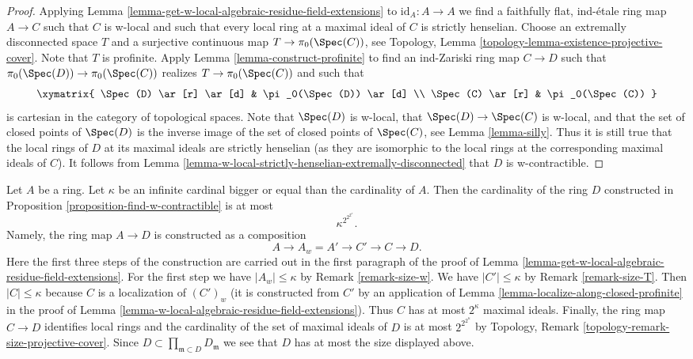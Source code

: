 \begin{proof}
Applying Lemma \ref{lemma-get-w-local-algebraic-residue-field-extensions}
to $\text{id}_A : A \to A$ we find a faithfully flat, ind-\'etale ring map
$A \to C$ such that $C$ is w-local and such that every local ring at a
maximal ideal of $C$ is strictly henselian.
Choose an extremally disconnected space $T$ and a surjective
continuous map $T \to \pi_0(\Spec(C))$, see
Topology, Lemma \ref{topology-lemma-existence-projective-cover}.
Note that $T$ is profinite. Apply Lemma \ref{lemma-construct-profinite}
to find an ind-Zariski ring map $C \to D$ such that
$\pi_0(\Spec(D)) \to \pi_0(\Spec(C))$ realizes $T \to \pi_0(\Spec(C))$
and such that
$$
\xymatrix{
\Spec(D) \ar[r] \ar[d] & \pi_0(\Spec(D)) \ar[d] \\
\Spec(C) \ar[r] & \pi_0(\Spec(C))
}
$$
is cartesian in the category of topological spaces. Note that $\Spec(D)$
is w-local, that $\Spec(D) \to \Spec(C)$ is w-local, and that the
set of closed points of $\Spec(D)$ is the inverse image of the
set of closed points of $\Spec(C)$, see Lemma \ref{lemma-silly}.
Thus it is still true that the local rings of $D$ at its maximal
ideals are strictly henselian (as they are isomorphic to the
local rings at the corresponding maximal ideals of $C$).
It follows from
Lemma \ref{lemma-w-local-strictly-henselian-extremally-disconnected}
that $D$ is w-contractible.
\end{proof}

\begin{remark}
\label{remark-size-w-contractible}
Let $A$ be a ring. Let $\kappa$ be an infinite cardinal bigger or
equal than the cardinality of $A$. Then the cardinality of the
ring $D$ constructed in Proposition \ref{proposition-find-w-contractible}
is at most
$$
\kappa^{2^{2^{2^\kappa}}}.
$$
Namely, the ring map $A \to D$ is
constructed as a composition
$$
A \to A_w = A' \to C' \to C \to D.
$$
Here the first three steps of the construction are carried out
in the first paragraph of the proof of
Lemma \ref{lemma-get-w-local-algebraic-residue-field-extensions}.
For the first step we have $|A_w| \leq \kappa$ by
Remark \ref{remark-size-w}.
We have $|C'| \leq \kappa$ by
Remark \ref{remark-size-T}.
Then $|C| \leq \kappa$ because $C$ is a localization of $(C')_w$
(it is constructed from $C'$ by an application of
Lemma \ref{lemma-localize-along-closed-profinite}
in the proof of Lemma \ref{lemma-w-local-algebraic-residue-field-extensions}).
Thus $C$ has at most $2^\kappa$ maximal ideals.
Finally, the ring map $C \to D$ identifies local rings and the
cardinality of the set of maximal ideals of $D$ is at most
$2^{2^{2^\kappa}}$ by
Topology, Remark \ref{topology-remark-size-projective-cover}.
Since $D \subset \prod_{\mathfrak m \subset D} D_\mathfrak m$ we see
that $D$ has at most the size displayed above.
\end{remark}

